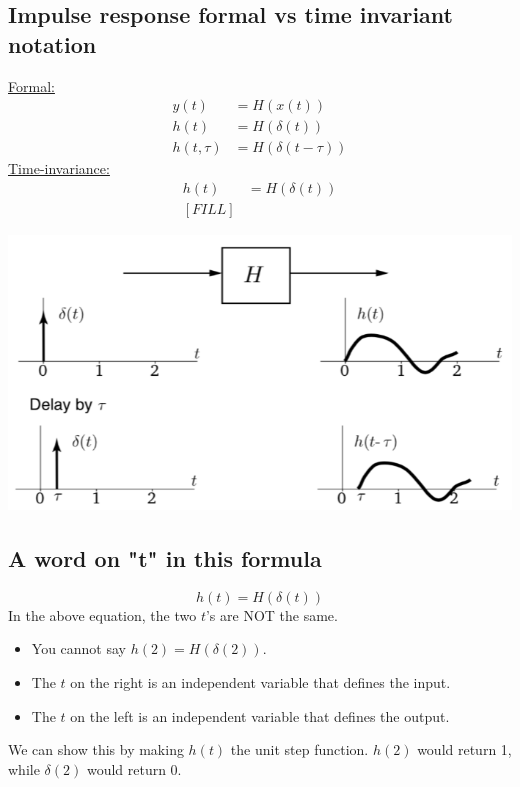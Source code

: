 \documentclass[10pt]{article}
\begin{document}
\subsection*{Impulse response formal vs time invariant notation}
\underline{Formal:}
\begin{align*}
    y(t) &= H(x(t)) \\
    h(t) &= H(\delta(t)) \\
    h(t , \tau) &= H(\delta(t - \tau))
\end{align*}
\underline{Time-invariance:}
\begin{align*}
    h(t) &= H(\delta(t)) \\
    [FILL]
\end{align*}
\begin{center}
    \includegraphics[scale=0.9]{W3_2.png}
\end{center}


\subsection*{A word on "t" in this formula}
\[h(t) = H(\delta(t))\]
In the above equation, the two $t$'s are NOT the same.
\begin{itemize}
    \item You cannot say $h(2) = H(\delta(2))$.
    \item The $t$ on the right is an independent variable that defines the input.
    \item The $t$ on the left is an independent variable that defines the output.
\end{itemize}
We can show this by making $h(t)$ the unit step function.  $h(2)$ would return 1, while $\delta(2)$ would return 0.
\end{document}

